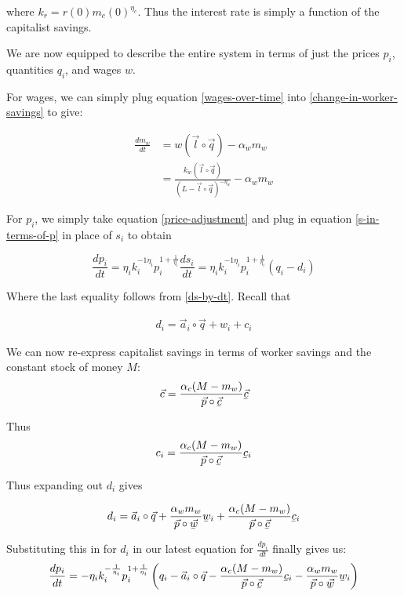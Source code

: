 \documentclass{article}
\newcommand{\ubar}[1]{\underaccent{\bar}{#1}}
\theoremstyle{definition}
\begin{document}
where $k_r = r(0)m_c(0)^{\eta_c}$. Thus the interest rate is simply a function of the capitalist savings. 

We are now equipped to describe the entire system in terms of just the prices $p_i$, quantities $q_i$, and wages $w$. 

For wages, we can simply plug equation \ref{wages-over-time} into \ref{change-in-worker-savings} to give:

\begin{align}
    \frac{dm_w}{dt} &= w(\vec{l}\circ\vec{q}) - \alpha_wm_w \\
                    &= \frac{k_w(\vec{l}\circ\vec{q})}{(L-\vec{l}\circ\vec{q})^{-\eta_w}}-\alpha_w m_w
\end{align}

For $p_i$, we simply take equation \ref{price-adjustment} and plug in equation \ref{s-in-terms-of-p} in place of $s_i$ to obtain 

\begin{equation}
    \frac{dp_i}{dt} = \eta_i k_i^{-{1}{\eta_i}}p_i^{1+\frac{1}{\eta_i}}\frac{ds_i}{dt} =  \eta_i k_i^{-{1}{\eta_i}}p_i^{1+\frac{1}{\eta_i}}(q_i-d_i)
\end{equation}

Where the last equality follows from \ref{ds-by-dt}. Recall that

\begin{align}
    d_i = \vec{a}_i\circ\vec{q}+w_i+c_i
\end{align}

We can now re-express capitalist savings in terms of worker savings and the constant stock of money $M$: 
\begin{equation}
    \vec{c} = \frac{\alpha_c(M-m_w)}{\vec{p}\circ \vec{\ubar{c}}}\vec{\ubar{c}}
\end{equation}

Thus 
\begin{equation}
    c_i = \frac{\alpha_c (M-m_w)}{\vec{p}\circ\vec{\ubar{c}}}\ubar{c}_i
\end{equation}

Thus expanding out $d_i$ gives

\begin{equation}
    d_i = \vec{a}_i \circ \vec{q}+\frac{\alpha_w m_w}{\vec{p}\circ\vec{\ubar{w}}}\ubar{w}_i + \frac{\alpha_c (M-m_w)}{\vec{p}\circ\vec{\ubar{c}}}\ubar{c}_i
\end{equation}

Substituting this in for $d_i$ in our latest equation for $\frac{dp_i}{dt}$ finally gives us:
\begin{equation}
    \frac{dp_i}{dt} = -\eta_i k_i^{-\frac{1}{\eta_i}}p_i^{1+\frac{1}{\eta_i}}\left( q_i-\vec{a}_i\circ\vec{q}-\frac{\alpha_c(M-m_w)}{\vec{p}\circ\vec{\ubar{c}}}\ubar{c}_i-\frac{\alpha_wm_w}{\vec{p}\circ\vec{\ubar{w}}}\ubar{w}_i \right)
\end{equation}
\end{document}
